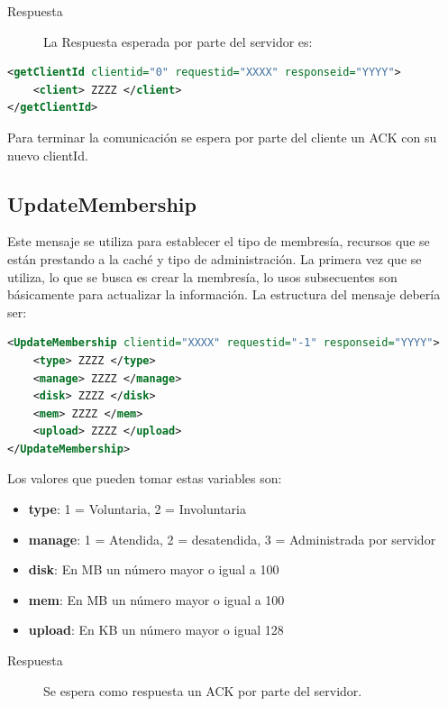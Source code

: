 \begin{description}
\item[Respuesta] La Respuesta esperada por parte del servidor es:
\end{description}

 \begin{lstlisting}[language=XML,caption=Mensaje de Respuesta GetClientId]
<getClientId clientid="0" requestid="XXXX" responseid="YYYY"> 
	<client> ZZZZ </client>
</getClientId>
\end{lstlisting}

Para terminar la comunicación se espera por parte del cliente un ACK con su nuevo clientId.

\subsection{UpdateMembership}

Este mensaje se utiliza para establecer el tipo de membresía, recursos que se están prestando a la caché y tipo de administración. La primera vez que se utiliza, lo que se busca es crear la membresía, lo usos subsecuentes son básicamente para actualizar la información. La estructura del mensaje debería ser:

\begin{lstlisting}[language=XML,caption=Mensaje de UpdateMembership]
<UpdateMembership clientid="XXXX" requestid="-1" responseid="YYYY"> 
	<type> ZZZZ </type>
	<manage> ZZZZ </manage>
	<disk> ZZZZ </disk>
	<mem> ZZZZ </mem>
	<upload> ZZZZ </upload>
</UpdateMembership>
\end{lstlisting}

Los valores que pueden tomar estas variables son:

\begin{itemize}
\item \textbf{type}: 1 = Voluntaria, 2 = Involuntaria
\item \textbf{manage}: 1 = Atendida, 2 = desatendida, 3 = Administrada por servidor
\item \textbf{disk}: En MB un número mayor o igual a 100
\item \textbf{mem}: En MB un número mayor o igual a 100
\item \textbf{upload}: En KB un número mayor o igual 128
\end{itemize}

\begin{description}
\item[Respuesta] Se espera como respuesta un ACK por parte del servidor.
\end{description}

